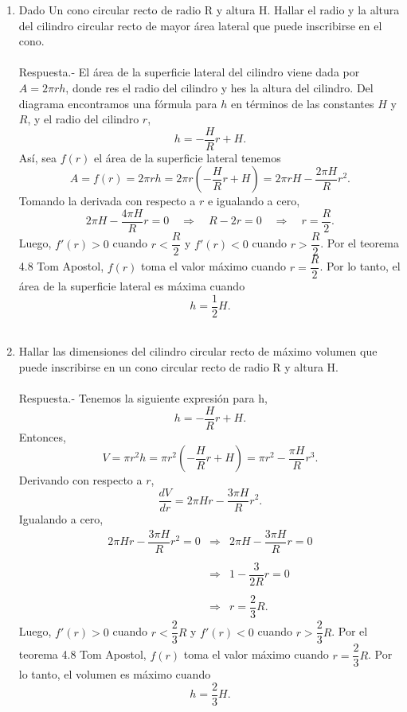 \begin{enumerate}[\bfseries 1.]
    \item Dado Un cono circular recto de radio R y altura H. Hallar el radio y la altura del cilindro circular recto de mayor área lateral que puede inscribirse en el cono.\\\\
	Respuesta.-\; El área de la superficie lateral del cilindro viene dada por $A = 2 \pi rh$, donde res el radio del cilindro y hes la altura del cilindro. Del diagrama encontramos una fórmula para $h$ en términos de las constantes $H$ y $R$, y el radio del cilindro $r$,
	$$h=-\dfrac{H}{R}r+H.$$
	Así, sea $f(r)$ el área de la superficie lateral tenemos
	$$A=f(r)=2\pi rh = 2\pi r\left(-\dfrac{H}{R}r+H\right)=2\pi rH-\dfrac{2\pi H}{R}r^2.$$
	Tomando la derivada con respecto a $r$ e igualando a cero,
	$$2\pi H - \dfrac{4\pi H}{R}r=0 \quad \Rightarrow \quad R-2r=0\quad \Rightarrow \quad r=\dfrac{R}{2}.$$
	Luego, $f'(r)>0$ cuando $r<\dfrac{R}{2}$ y $f'(r)<0$ cuando $r>\dfrac{R}{2}$. Por el teorema 4.8 Tom Apostol, $f(r)$ toma el valor máximo cuando $r=\dfrac{R}{2}$. Por lo tanto, el área de la superficie lateral es máxima cuando
	$$h=\dfrac{1}{2}H.$$\\

    \item Hallar las dimensiones del cilindro circular recto de máximo volumen que puede inscribirse en un cono circular recto de radio R y altura H.\\\\
	Respuesta.-\; Tenemos la siguiente expresión para h,
	$$h=-\dfrac{H}{R}r+H.$$
	Entonces,
	$$V=\pi r^2 h = \pi r^2 \left(-\dfrac{H}{R}r+H\right)=\pi r^2-\dfrac{\pi H}{R}r^3.$$
	Derivando con respecto a $r$,
	$$\dfrac{dV}{dr}=2\pi Hr-\dfrac{3\pi H}{R}r^2.$$
	Igualando a cero,
	$$\begin{array}{rcl}
	    2\pi Hr-\dfrac{3\pi H}{R}r^2=0&\Rightarrow& 2\pi H - \dfrac{3\pi H}{R}r=0\\\\
					  &\Rightarrow& 1-\dfrac{3}{2R}r=0\\\\
					  &\Rightarrow& r=\dfrac{2}{3}R.
	\end{array}$$
	Luego, $f'(r)>0$ cuando $r<\dfrac{2}{3}R$ y $f'(r)<0$ cuando $r>\dfrac{2}{3}R$. Por el teorema 4.8 Tom Apostol, $f(r)$ toma el valor máximo cuando $r=\dfrac{2}{3}R$. Por lo tanto, el volumen es máximo cuando
	$$h=\dfrac{2}{3}H.$$\\


\end{enumerate}
